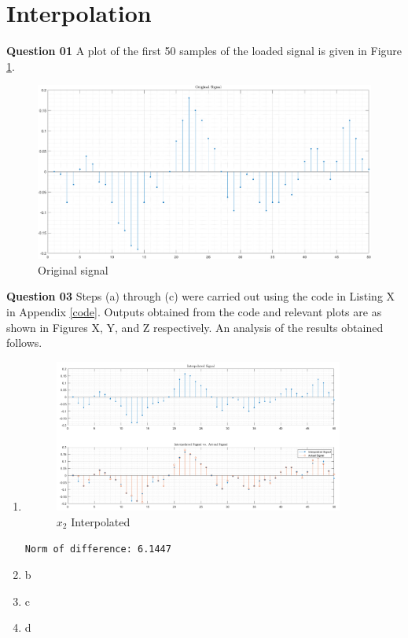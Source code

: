 \documentclass{article}[a4paper]
\begin{document}
	\section{Interpolation}
	
	\textbf{Question 01} A plot of the first 50 samples of the loaded signal is given in Figure \ref{orig_x1}.
	
	\begin{figure}[H]
		\centering
		\includegraphics[width=0.9\linewidth]{images/q2_orig_sig.png}
		\caption{Original signal}
		\label{orig_x1}
	\end{figure}
	
	\textbf{Question 03} Steps (a) through (c) were carried out using the code in Listing X in Appendix \ref{code}. Outputs obtained from the code and relevant plots are as shown in Figures X, Y, and Z respectively. An analysis of the results obtained follows.
	
	\begin{enumerate}[label=(\alph*)]
		\item \phantom{a}
		\begin{figure}[H]
			\centering
			\includegraphics[width=0.9\textwidth]{images/q2_x2_interp.png}
			\caption{$x_2$ Interpolated}
			\label{x2_interp}
		\end{figure}
		
		\begin{lstlisting}[caption={abc}]
Norm of difference: 6.1447
		\end{lstlisting}
		
		\item b
		\item c
		\item d
	\end{enumerate}
	
\end{document}
